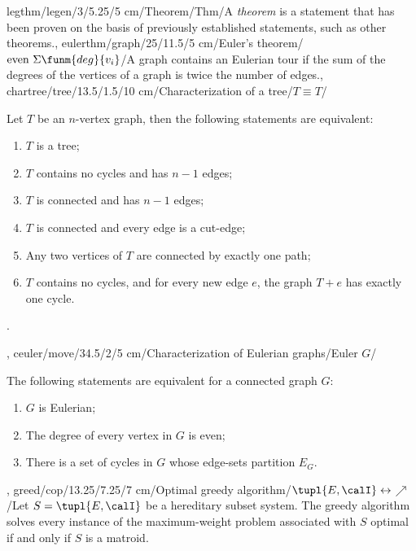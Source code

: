 legthm/legen/3/5.25/5 cm/Theorem/Thm/{A \emph{theorem} is a statement that has been proven on the basis of previously established statements, such as other theorems.},
eulerthm/graph/25/11.5/5 cm/{Euler's theorem}/$\mbox{even}\ \Sigma{\funm{deg}{v_i}}$/{A graph contains an Eulerian tour if the sum of the degrees of the vertices of a graph is twice the number of edges.},
chartree/tree/13.5/1.5/10 cm/{Characterization of a tree}/{$T\equiv T$}/{Let $T$ be an $n$-vertex graph, then the following statements are equivalent:\begin{enumerate}\item $T$ is a tree; \item $T$ contains no cycles and has $n-1$ edges; \item $T$ is connected and has $n-1$ edges; \item $T$ is connected and every edge is a cut-edge; \item Any two vertices of $T$ are connected by exactly one path; \item $T$ contains no cycles, and for every new edge $e$, the graph $T+e$ has exactly one cycle.\end{enumerate}.},
ceuler/move/34.5/2/5 cm/{Characterization of Eulerian graphs}/{Euler $G$}/{The following statements are equivalent for a connected graph $G$:\begin{enumerate}\item $G$ is Eulerian; \item The degree of every vertex in $G$ is even; \item There is a set of cycles in $G$ whose edge-sets partition $E_G$.\end{enumerate}},
greed/cop/13.25/7.25/7 cm/{Optimal greedy algorithm}/{$\tupl{E,\calI}\leftrightarrow$\textdollaroldstyle$\nearrow$}/{Let $S=\tupl{E,\calI}$ be a hereditary subset system. The greedy algorithm solves every instance of the maximum-weight problem associated with $S$ optimal if and only if $S$ is a matroid.}%